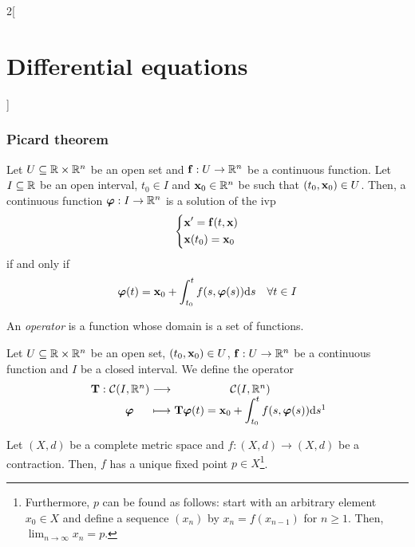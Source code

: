 \documentclass[../../../main.tex]{subfiles}
\begin{document}
\begin{multicols}{2}[\section{Differential equations}]
  \subsubsection{Picard theorem}
  \begin{prop}
    Let $U\subseteq\mathbb{R}\times\mathbb{R}^n$ be an open set and $\boldsymbol{\mathrm{f}}:U\rightarrow\mathbb{R}^n$ be a continuous function. Let $I\subseteq\mathbb{R}$ be an open interval, $t_0\in I$ and $\boldsymbol{\mathrm{x}}_0\in\mathbb{R}^n$ be such that $(t_0,\boldsymbol{\mathrm{x}}_0)\in U$. Then, a continuous function $\boldsymbol{\mathrm{\varphi}}:I\rightarrow\mathbb{R}^n$ is a solution of the ivp
    \begin{equation}
      \left\{
      \begin{aligned}
         & \boldsymbol{\mathrm{x}}'=\boldsymbol{\mathrm{f}}(t,\boldsymbol{\mathrm{x}}) \\
         & \boldsymbol{\mathrm{x}}(t_0)=\boldsymbol{\mathrm{x}}_0
      \end{aligned}
      \right.
      \label{DE_ivp}
    \end{equation}
    if and only if $$\boldsymbol{\mathrm{\varphi}}(t)=\boldsymbol{\mathrm{x}}_0+\int_{t_0}^tf(s,\boldsymbol{\mathrm{\varphi}}(s))\dd s\quad\forall t\in I$$
  \end{prop}
  \begin{definition}
    An \textit{operator} is a function whose domain is a set of functions.
  \end{definition}
  \begin{definition}
    Let $U\subseteq\mathbb{R}\times\mathbb{R}^n$ be an open set, $(t_0,\boldsymbol{\mathrm{x}}_0)\in U$, $\boldsymbol{\mathrm{f}}:U\rightarrow\mathbb{R}^n$ be a continuous function and $I$ be a closed interval. We define the operator
    $$
      \function{\vectorfunction{T}}
      {\mathcal{C}(I,\RR^n)}
      {\mathcal{C}(I,\RR^n)}
      {\vectorfunction{\varphi}}
      {\displaystyle\vectorfunction{T}\vectorfunction{\varphi}(t)=\vectorfunction{x}_0+\int_{t_0}^tf(s,\vectorfunction{\varphi}(s))\dd s\footnotemark}
    $$
  \end{definition}
  \begin{theorem}
    Let $(X,d)$ be a complete metric space and $f:(X,d)\rightarrow (X,d)$ be a contraction. Then, $f$ has a unique fixed point $p\in X$\footnote{Furthermore, $p$ can be found as follows: start with an arbitrary element $x_0\in X$ and define a sequence $(x_n)$ by $x_n=f(x_{n-1})$ for $n\geq 1$. Then, $\displaystyle\lim_{n\to\infty} x_n=p$.}.

\end{theorem}
\end{multicols}
\end{document}

